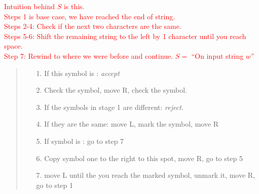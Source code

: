 \textcolor{red}{
Intuition behind $S$ is this.\\ 
Steps 1 is base case, we have reached the end of string.\\
Steps 2-4: Check if the next two characters are the same.\\
Steps 5-6: Shift the remaining string to the left by 1 character until you reach space.\\
Step 7: Rewind to where we were before and continue.\newp
$S = $ ``On input string $w$''
\begin{quote}
\begin{enumerate}
    \item[1.] If this symbol is \spc: \emph{accept}
    \item[2.] Check the symbol, move R, check the symbol.
    \item[3.] If the symbols in stage 1 are different: \emph{reject}. 
    \item[4.] If they are the same:  move L, mark the symbol, move R
    \item[5.] If symbol is \spc: go to step 7
    \item[6.] Copy symbol one to the right to this spot, move R, go to step 5
    \item[7.] move L until the you reach the marked symbol, unmark it, move R, go to step 1
\end{enumerate}
\end{quote}
}